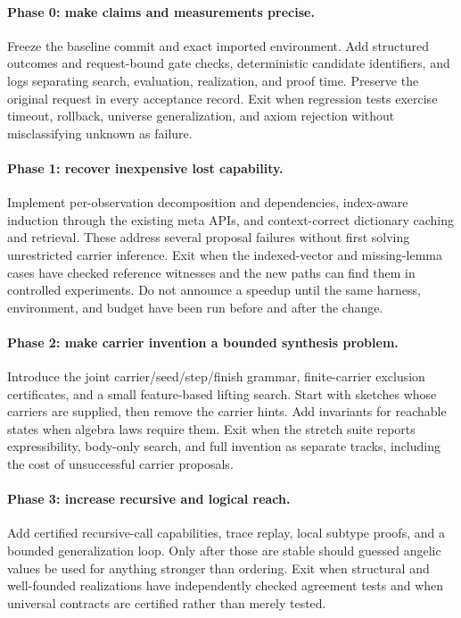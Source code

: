 \documentclass[11pt,a4paper]{article}
\theoremstyle{definition}
\theoremstyle{remark}
\begin{document}
\paragraph{Phase 0: make claims and measurements precise.}
Freeze the baseline commit and exact imported environment. Add structured
outcomes and request-bound gate checks, deterministic candidate identifiers,
and logs separating search, evaluation, realization, and proof time. Preserve
the original request in every acceptance record. Exit when regression tests
exercise timeout, rollback, universe generalization, and axiom rejection without
misclassifying unknown as failure.

\paragraph{Phase 1: recover inexpensive lost capability.}
Implement per-observation decomposition and dependencies, index-aware induction
through the existing meta APIs, and context-correct dictionary caching and
retrieval. These address several proposal failures without first solving
unrestricted carrier inference. Exit when the indexed-vector and missing-lemma
cases have checked reference witnesses and the new paths can find them in
controlled experiments. Do not announce a speedup until the same harness,
environment, and budget have been run before and after the change.

\paragraph{Phase 2: make carrier invention a bounded synthesis problem.}
Introduce the joint carrier/seed/step/finish grammar, finite-carrier exclusion
certificates, and a small feature-based lifting search. Start with sketches
whose carriers are supplied, then remove the carrier hints. Add invariants for
reachable states when algebra laws require them. Exit when the stretch suite
reports expressibility, body-only search, and full invention as separate tracks,
including the cost of unsuccessful carrier proposals.

\paragraph{Phase 3: increase recursive and logical reach.}
Add certified recursive-call capabilities, trace replay, local subtype proofs,
and a bounded generalization loop. Only after those are stable should guessed
angelic values be used for anything stronger than ordering. Exit when structural
and well-founded realizations have independently checked agreement tests and
when universal contracts are certified rather than merely tested.
\end{document}

